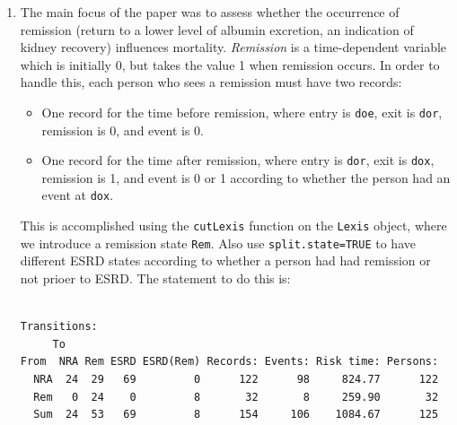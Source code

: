 \documentclass[
]{book}
\newenvironment{Shaded}{\begin{snugshade}}{\end{snugshade}}
\newcommand{\AttributeTok}[1]{\textcolor[rgb]{0.13,0.29,0.53}{#1}}
\newcommand{\CommentTok}[1]{\textcolor[rgb]{0.56,0.35,0.01}{\textit{#1}}}
\newcommand{\ConstantTok}[1]{\textcolor[rgb]{0.56,0.35,0.01}{#1}}
\newcommand{\FunctionTok}[1]{\textcolor[rgb]{0.13,0.29,0.53}{\textbf{#1}}}
\newcommand{\NormalTok}[1]{#1}
\newcommand{\OtherTok}[1]{\textcolor[rgb]{0.56,0.35,0.01}{#1}}
\newcommand{\SpecialCharTok}[1]{\textcolor[rgb]{0.81,0.36,0.00}{\textbf{#1}}}
\newcommand{\StringTok}[1]{\textcolor[rgb]{0.31,0.60,0.02}{#1}}
\providecommand{\tightlist}{%
  \setlength{\itemsep}{0pt}\setlength{\parskip}{0pt}}
\theoremstyle{definition}
\theoremstyle{definition}
\theoremstyle{definition}
\theoremstyle{definition}
\theoremstyle{remark}
\begin{document}
\begin{enumerate}
  What is the hazard ratio between males and females?
  Between two persons who differ 10 years in age at entry?
\item
  The main focus of the paper was to assess whether the occurrence of
  remission (return to a lower level of albumin excretion, an
  indication of kidney recovery) influences mortality.
  \emph{Remission} is a time-dependent variable which is initially 0, but
  takes the value 1 when remission occurs. In order to handle this, each
  person who sees a remission must have two records:

  \begin{itemize}
  \tightlist
  \item
    One record for the time before remission, where entry is
    \texttt{doe}, exit is \texttt{dor}, remission is 0, and event is 0.
  \item
    One record for the time after remission, where entry is
    \texttt{dor}, exit is \texttt{dox}, remission is 1, and event is 0
    or 1 according to whether the person had an event at \texttt{dox}.
  \end{itemize}

  This is accomplished using the \texttt{cutLexis} function on the
  \texttt{Lexis} object, where we introduce a remission state \texttt{Rem}.
  Also use \texttt{split.state=TRUE} to
  have different ESRD states according to whether a person had had
  remission or not prioer to ESRD. The statement to do this is:

\begin{Shaded}
\end{Shaded}

\begin{verbatim}

Transitions:
     To
From  NRA Rem ESRD ESRD(Rem) Records: Events: Risk time: Persons:
  NRA  24  29   69         0      122      98     824.77      122
  Rem   0  24    0         8       32       8     259.90       32
  Sum  24  53   69         8      154     106    1084.67      125
\end{verbatim}


\end{enumerate}
\end{document}
